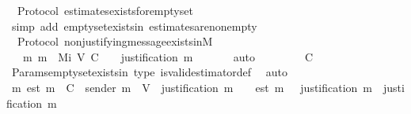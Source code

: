 \begin{isabellebody}
%
\endisadelimproof
\isanewline
{}\isamarkupfalse%
\ {\isacharparenleft}\ Protocol{\isacharparenright}\ estimates{\isacharunderscore}exists{\isacharunderscore}for{\isacharunderscore}empty{\isacharunderscore}set\ {\isacharcolon}\isanewline
\ \ {\isachardoublequoteopen}{\isasymepsilon}\ {\isasymemptyset}\ {\isasymnoteq}\ {\isasymemptyset}{\isachardoublequoteclose}\isanewline
%
\isadelimproof
\ \ %
\endisadelimproof
%
\isatagproof
{}\isamarkupfalse%
\ {\isacharparenleft}simp\ add{\isacharcolon}\ empty{\isacharunderscore}set{\isacharunderscore}exists{\isacharunderscore}in{\isacharunderscore}{\isasymSigma}\ estimates{\isacharunderscore}are{\isacharunderscore}non{\isacharunderscore}empty{\isacharparenright}%
\endisatagproof
{\isafoldproof}%
%
\isadelimproof
\isanewline
%
\endisadelimproof
\isanewline
{}\isamarkupfalse%
\ {\isacharparenleft}\ Protocol{\isacharparenright}\ non{\isacharunderscore}justifying{\isacharunderscore}message{\isacharunderscore}exists{\isacharunderscore}in{\isacharunderscore}M{\isacharunderscore}{}{\isacharcolon}\ \isanewline
\ \ {\isachardoublequoteopen}{\isasymexists}\ m{\isachardot}\ m\ {\isasymin}\ M{\isacharunderscore}i\ {\isacharparenleft}V{\isacharcomma}\ C{\isacharcomma}\ {\isasymepsilon}{\isacharparenright}\ {}\ {\isasymand}\ justification\ m\ {\isacharequal}\ {\isasymemptyset}{\isachardoublequoteclose}\ \isanewline
%
\isadelimproof
\ \ %
\endisadelimproof
%
\isatagproof
{}\isamarkupfalse%
\ auto\isanewline
{}\isamarkupfalse%
\ {\isacharminus}\isanewline
\ \ \isamarkupfalse%
\ {\isachardoublequoteopen}{\isasymepsilon}\ {\isasymemptyset}\ {\isasymsubseteq}\ C{\isachardoublequoteclose}\isanewline
\ \ \ \ \isamarkupfalse%
\ Params{\isachardot}empty{\isacharunderscore}set{\isacharunderscore}exists{\isacharunderscore}in{\isacharunderscore}{\isasymSigma}\ {\isasymepsilon}{\isacharunderscore}type\ is{\isacharunderscore}valid{\isacharunderscore}estimator{\isacharunderscore}def\ \isamarkupfalse%
\ auto\isanewline
\ \ \isamarkupfalse%
\ \isamarkupfalse%
\ {\isachardoublequoteopen}{\isasymexists}m{\isachardot}\ est\ m\ {\isasymin}\ C\ {\isasymand}\ sender\ m\ {\isasymin}\ V\ {\isasymand}\ justification\ m\ {\isacharequal}\ {\isasymemptyset}\ {\isasymand}\ est\ m\ {\isasymin}\ {\isasymepsilon}\ {\isacharparenleft}justification\ m{\isacharparenright}\ {\isasymand}\ justification\ m\ {\isacharequal}\ {\isasymemptyset}{\isachardoublequoteclose}\isanewline

\end{isabellebody}
